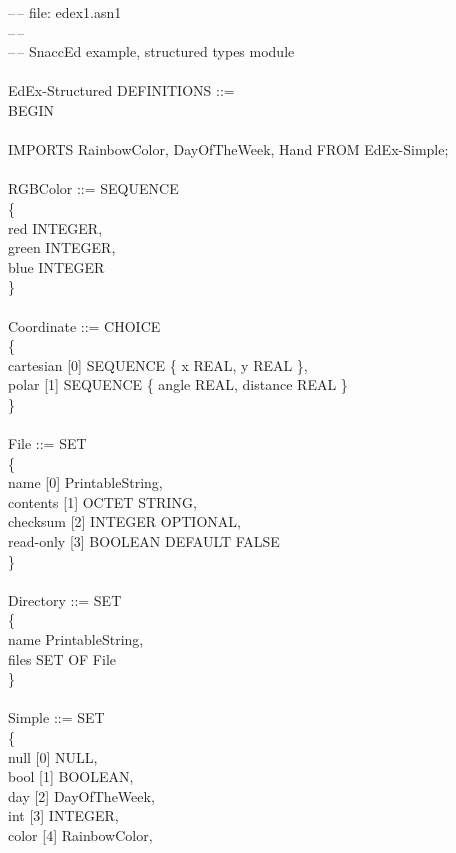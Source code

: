 \begin{ASNcode}
\label{edex1.asn1}%
--\,-- file: edex1.asn1\\
--\,--\\
--\,-- SnaccEd example, structured types module\\
\\
EdEx-Structured DEFINITIONS ::=\\
BEGIN\\
\\
IMPORTS RainbowColor, DayOfTheWeek, Hand FROM EdEx-Simple;\\
\\
RGBColor ::= SEQUENCE\\
\{\+\\
  red INTEGER,\\
  green INTEGER,\\
  blue INTEGER\-\\
\}\\
\\
Coordinate ::= CHOICE\\
\{\+\\
  cartesian [0] SEQUENCE \{ x REAL, y REAL \},\\
  polar [1] SEQUENCE \{ angle REAL, distance REAL \}\-\\
\}\\
\\
File ::= SET\\
\{\+\\
  name [0] PrintableString,\\
  contents [1] OCTET STRING,\\
  checksum [2] INTEGER OPTIONAL,\\
  read-only [3] BOOLEAN DEFAULT FALSE\-\\
\}\\
\\
Directory ::= SET\\
\{\+\\
  name PrintableString,\\
  files SET OF File\-\\
\}\\
\\
Simple ::= SET\\
\{\+\\
  null   [0] NULL,\\
  bool   [1] BOOLEAN,\\
  day    [2] DayOfTheWeek,\\
  int    [3] INTEGER,\\
  color  [4] RainbowColor,\\

\end{ASNcode}
